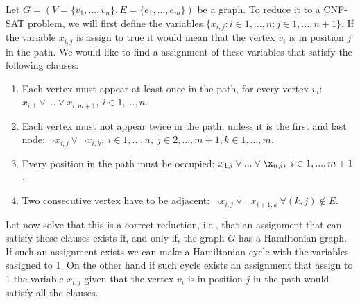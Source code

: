Let $G=(V=\{ v_1,...,v_n\},E= \{e_1,...,e_m\})$ be a graph. To reduce it to a CNF-SAT problem, we will first define the variables $\{x_{i,j}: i\in 1,...,n ; j\in 1,...,n+1 \}$. If the variable $x_{i,j}$ is assign to true it would mean that the vertex $v_i$ is in position $j$ in the path. We would like to find a assignment of these variables that satisfy the following clauses:

\begin{enumerate}
\item Each vertex must appear at least once in the path, for every vertex $v_i$:
  $ x_{i,1} \vee ... \vee x_{i,m+1},\ i \in 1,...,n$.
\item Each vertex must not appear twice in the path, unless it is the first and last node: $\neg x_{i,j} \vee \neg x_{i,k},\ i \in 1,...,n ,\ j \in 2,...,m+1, k \in 1,...,m$.
\item Every position in the path must be occupied:   $ x_{1,i} \vee ... \vee \x_{n,i},\ i \in 1,...,m+1$.
\item Two consecutive vertex have to be adjacent: $\neg x_{i,j} \vee \neg x_{i+1,k}\ \forall (k,j) \not \in E$.
\end{enumerate}

Let now solve that this is a correct reduction, i.e., that an assignment that can satisfy these clauses exists if, and only if, the graph $G$ has a Hamiltonian graph. If such an assignment exists we can make a Hamiltonian cycle with the variables sasigned to 1. On the other hand if such cycle exists an assignment that assign to 1 the variable $x_{i,j}$ given that the vertex $v_i$ is in position $j$ in the path would satisfy all the clauses. 
